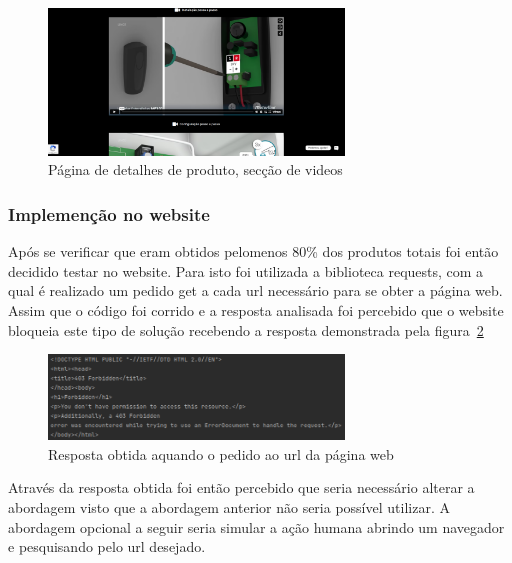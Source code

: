 \begin{figure}[htb]
    \centering
    
    \includegraphics[width=0.7\textwidth]{images/implementacao/scraper/pagina_detalhes_videos.png}
    \caption{Página de detalhes de produto, secção de videos}
    \label{fig:55}
\end{figure}

\newpage

\subsubsection{Implemenção no website}

Após se verificar que eram obtidos pelomenos 80\% dos produtos totais foi então decidido testar no website. Para isto foi utilizada a biblioteca
requests, com a qual é realizado um pedido get a cada url necessário para se obter a página web. Assim que o código foi corrido e a resposta analisada
foi percebido que o website bloqueia este tipo de solução recebendo a resposta demonstrada pela figura~\ref{fig:56}

\begin{figure}[htb]
    \centering
    
    \includegraphics[width=0.7\textwidth]{images/implementacao/scraper/forbiden_response.png}
    \caption{Resposta obtida aquando o pedido ao url da página web}
    \label{fig:56}
\end{figure}

Através da resposta obtida foi então percebido que seria necessário alterar a abordagem visto que a abordagem anterior não seria possível utilizar.
A abordagem opcional a seguir seria simular a ação humana abrindo um navegador e pesquisando pelo url desejado. 


